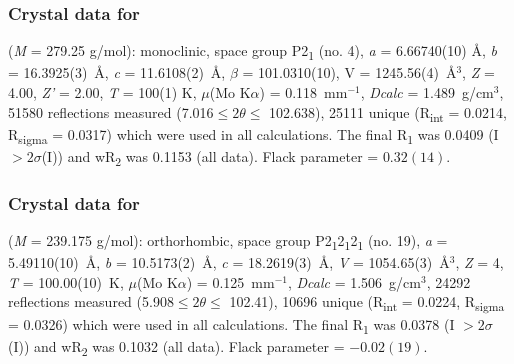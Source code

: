 \begin{refsection}
\subsubsection{Crystal data for \texorpdfstring{}{C12H13N3O5}}
 (\emph{M} = 279.25 g/mol): monoclinic, space group P2\textsubscript{1} (no. 4), \emph{a} = 6.66740(10) \AA, \emph{b} = 16.3925(3)~\AA, \emph{c} = 11.6108(2)~\AA, $\beta$ = 101.0310(10)\degree{}, V = 1245.56(4)~\AA$^3$, \emph{Z} = 4.00, \emph{Z'} = 2.00, \emph{T} = 100(1) K, $\mu$(Mo K$\alpha$) = 0.118~mm$^{-1}$, \emph{Dcalc} = 1.489~g/cm$^3$, 51580 reflections measured (7.016\degree{}$\leq 2\theta \leq$ 102.638\degree{}), 25111 unique (R\textsubscript{int} = 0.0214, R\textsubscript{sigma} = 0.0317) which were used in all calculations. The final R\textsubscript{1} was 0.0409 (I $> 2\sigma$(I)) and wR\textsubscript{2} was 0.1153 (all data). Flack parameter = $0.32(14)$.

\subsubsection{Crystal data for \texorpdfstring{}{C9H9N3O5}}
 (\emph{M} = 239.175 g/mol): orthorhombic, space group P2\textsubscript{1}2\textsubscript{1}2\textsubscript{1} (no. 19), \emph{a} = 5.49110(10)~\AA, \emph{b} = 10.5173(2)~\AA, \emph{c} = 18.2619(3)~\AA, \emph{V} = 1054.65(3)~\AA$^3$, \emph{Z} = 4, \emph{T} = 100.00(10)~K, $\mu$(Mo K$\alpha$) = 0.125~mm$^{-1}$, \emph{Dcalc} = 1.506~g/cm$^3$, 24292 reflections measured (5.908\degree{}$\leq 2\theta \leq$ 102.41\degree{}), 10696 unique (R\textsubscript{int} = 0.0224, R\textsubscript{sigma} = 0.0326) which were used in all calculations. The final R\textsubscript{1} was 0.0378 (I $> 2\sigma$(I)) and wR\textsubscript{2} was 0.1032 (all data). Flack parameter = $-0.02(19)$.

\printbibliography[heading=subbibliography]
\end{refsection}

